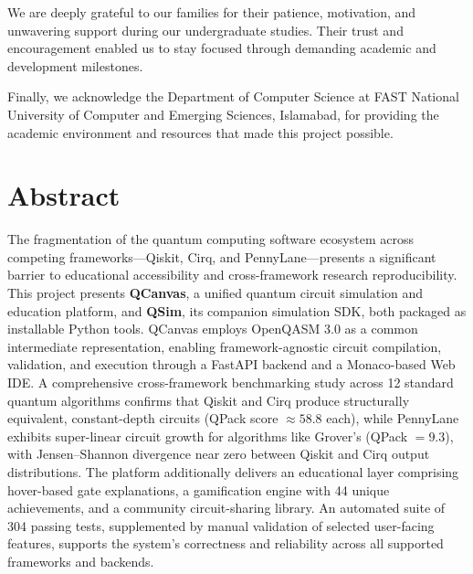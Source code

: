 \documentclass{fast-nuces-bs}
\begin{document}
We are deeply grateful to our families for their patience, motivation, and unwavering support during our undergraduate studies. Their trust and encouragement enabled us to stay focused through demanding academic and development milestones.

Finally, we acknowledge the Department of Computer Science at FAST National University of Computer and Emerging Sciences, Islamabad, for providing the academic environment and resources that made this project possible.

\chapter*{Abstract}

The fragmentation of the quantum computing software ecosystem across competing frameworks---Qiskit, Cirq, and PennyLane---presents a significant barrier to educational accessibility and cross-framework research reproducibility. This project presents \textbf{QCanvas}, a unified quantum circuit simulation and education platform, and \textbf{QSim}, its companion simulation SDK, both packaged as installable Python tools. QCanvas employs OpenQASM 3.0 as a common intermediate representation, enabling framework-agnostic circuit compilation, validation, and execution through a FastAPI backend and a Monaco-based Web IDE. A comprehensive cross-framework benchmarking study across 12 standard quantum algorithms confirms that Qiskit and Cirq produce structurally equivalent, constant-depth circuits (QPack score $\approx 58.8$ each), while PennyLane exhibits super-linear circuit growth for algorithms like Grover's (QPack $= 9.3$), with Jensen--Shannon divergence near zero between Qiskit and Cirq output distributions. The platform additionally delivers an educational layer comprising hover-based gate explanations, a gamification engine with 44 unique achievements, and a community circuit-sharing library. An automated suite of 304 passing tests, supplemented by manual validation of selected user-facing features, supports the system's correctness and reliability across all supported frameworks and backends.







\appendix




\end{document}
